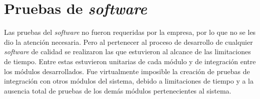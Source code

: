 \section{Pruebas de \emph{software}}

Las pruebas del \emph{software} no fueron requeridas por la empresa, por lo que no se les dio la atención necesaria. Pero al pertenecer al proceso de desarrollo de cualquier \emph{software} de calidad se realizaron las que estuvieron al alcance de las limitaciones de tiempo. Entre estas estuvieron unitarias de cada módulo y de integración entre los módulos desarrollados. Fue virtualmente imposible la creación de pruebas de integración con otros módulos del sistema, debido a limitaciones de tiempo y a la ausencia total de pruebas de los demás módulos pertenecientes al sistema.

